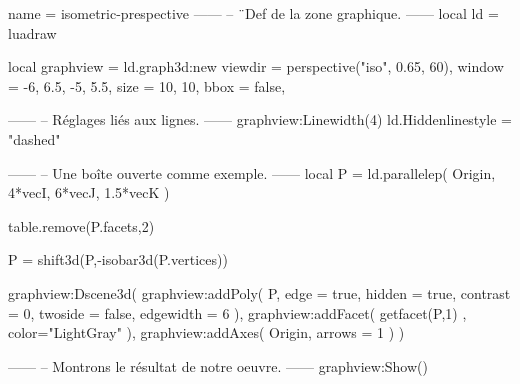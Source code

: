 \documentclass[border = 3pt]{standalone}
\begin{document}
\begin{luadraw}{name = isometric-prespective}
------
-- ¨Def de la zone graphique.
------
local ld = luadraw

local graphview = ld.graph3d:new{
  viewdir = perspective("iso", 0.65, 60),
  window  = {-6, 6.5, -5, 5.5},
  size    = {10, 10},
  bbox    = false,
}

------
-- Réglages liés aux lignes.
------
graphview:Linewidth(4)
ld.Hiddenlinestyle = "dashed"

------
-- Une boîte ouverte comme exemple.
------
local P = ld.parallelep(
  Origin,
  4*vecI, 6*vecJ, 1.5*vecK
)

table.remove(P.facets,2)

P = shift3d(P,-isobar3d(P.vertices))

graphview:Dscene3d(
  graphview:addPoly(
    P,
    {
      edge      = true,
      hidden    = true,
      contrast  = 0,
      twoside   = false,
      edgewidth = 6
    }
  ),
  graphview:addFacet(
    getfacet(P,1) ,
    {
      color="LightGray"
    }
  ),
  graphview:addAxes(
    Origin,
    {
      arrows = 1
    }
  )
)

------
-- Montrons le résultat de notre oeuvre.
------
graphview:Show()
\end{luadraw}
\end{document}
